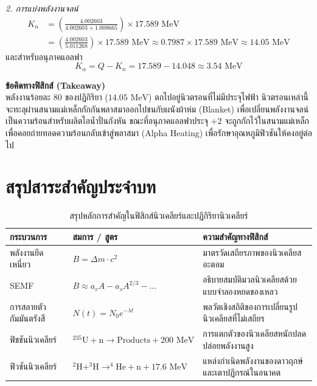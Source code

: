 \begin{psctexample}
\textit{2. การแบ่งพลังงานจลน์}
\begin{align}
K_n &= \left(\frac{4.002603}{4.002603 + 1.008665}\right) \times 17.589\text{ MeV} \nonumber \\
&= \left(\frac{4.002603}{5.011268}\right) \times 17.589\text{ MeV} \approx 0.7987 \times 17.589\text{ MeV} \approx 14.05\text{ MeV}
\end{align}
และสำหรับอนุภาคแอลฟา
\begin{equation}
K_\alpha = Q - K_n = 17.589 - 14.048 \approx 3.54\text{ MeV}
\end{equation}

\textbf{ข้อคิดทางฟิสิกส์ (Takeaway)} \\
พลังงานร้อยละ 80 ของปฏิกิริยา ($14.05\text{ MeV}$) ตกไปอยู่นิวตรอนที่ไม่มีประจุไฟฟ้า นิวตรอนเหล่านี้จะทะลุผ่านสนามแม่เหล็กกักกันพลาสมาออกไปชนกับผนังผ้าห่ม (Blanket) เพื่อเปลี่ยนพลังงานจลน์เป็นความร้อนสำหรับผลิตไอน้ำปั่นกังหัน ขณะที่อนุภาคแอลฟาประจุ $+2$ จะถูกกักไว้ในสนามแม่เหล็กเพื่อคอยถ่ายทอดความร้อนกลับเข้าสู่พลาสมา (Alpha Heating) เพื่อรักษาอุณหภูมิฟิวชันให้คงอยู่ต่อไป
\qedexam
\end{psctexample}

\section{สรุปสาระสำคัญประจำบท}

\begin{table}[H]
\centering
\small
\begin{tabularx}{\textwidth}{l >{\centering\arraybackslash}p{4.2cm} Y}
\toprule
\textbf{กระบวนการ} & \textbf{สมการ / สูตร} & \textbf{ความสำคัญทางฟิสิกส์} \\
\midrule
พลังงานยึดเหนี่ยว & $B = \Delta m \cdot c^2$ & มาตรวัดเสถียรภาพของนิวเคลียสอะตอม \\
SEMF & $B \approx a_v A - a_s A^{2/3} - \dots$ & อธิบายสมบัติมวลนิวเคลียสด้วยแบบจำลองหยดของเหลว \\
การสลายตัวกัมมันตรังสี & $N(t) = N_0 e^{-\lambda t}$ & พลวัตเชิงสถิติของการเปลี่ยนรูปนิวเคลียสที่ไม่เสถียร \\
ฟิชชันนิวเคลียร์ & $^{235}\text{U} + \text{n} \to \text{Products} + 200\text{ MeV}$ & การแตกตัวของนิวเคลียสหนักปลดปล่อยพลังงานสูง \\
ฟิวชันนิวเคลียร์ & $^2\text{H} + ^3\text{H} \to ^4\text{He} + \text{n} + 17.6\text{ MeV}$ & แหล่งกำเนิดพลังงานของดาวฤกษ์และเตาปฏิกรณ์ในอนาคต \\
\bottomrule
\end{tabularx}
\caption{สรุปหลักการสำคัญในฟิสิกส์นิวเคลียร์และปฏิกิริยานิวเคลียร์}
\label{tab:nuclear_summary}
\end{table}

